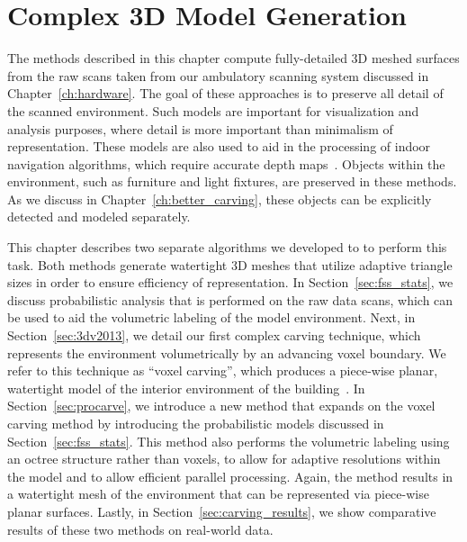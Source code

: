 \documentclass[12pt,onecolumn,oneside]{book}
\begin{document}

\chapter{Complex 3D Model Generation}
\label{ch:carving}

The methods described in this chapter compute fully-detailed 3D meshed surfaces from the raw scans taken from our ambulatory scanning system discussed in Chapter~\ref{ch:hardware}.  The goal of these approaches is to preserve all detail of the scanned environment.  Such models are important for visualization and analysis purposes, where detail is more important than minimalism of representation.  These models are also used to aid in the processing of indoor navigation algorithms, which require accurate depth maps~\cite{Liang13}.  Objects within the environment, such as furniture and light fixtures, are preserved in these methods.  As we discuss in Chapter~\ref{ch:better_carving}, these objects can be explicitly detected and modeled separately.

This chapter describes two separate algorithms we developed to to perform this task.  Both methods generate watertight 3D meshes that utilize adaptive triangle sizes in order to ensure efficiency of representation.  In Section~\ref{sec:fss_stats}, we discuss probabilistic analysis that is performed on the raw data scans, which can be used to aid the volumetric labeling of the model environment.  Next, in Section~\ref{sec:3dv2013}, we detail our first complex carving technique, which represents the environment volumetrically by an advancing voxel boundary.  We refer to this technique as ``voxel carving'', which produces a piece-wise planar, watertight model of the interior environment of the building~\cite{Turner13}.  In Section~\ref{sec:procarve}, we introduce a new method that expands on the voxel carving method by introducing the probabilistic models discussed in Section~\ref{sec:fss_stats}.  This method also performs the volumetric labeling using an octree structure rather than voxels, to allow for adaptive resolutions within the model and to allow efficient parallel processing.  Again, the method results in a watertight mesh of the environment that can be represented via piece-wise planar surfaces.  Lastly, in Section~\ref{sec:carving_results}, we show comparative results of these two methods on real-world data.
\end{document}
